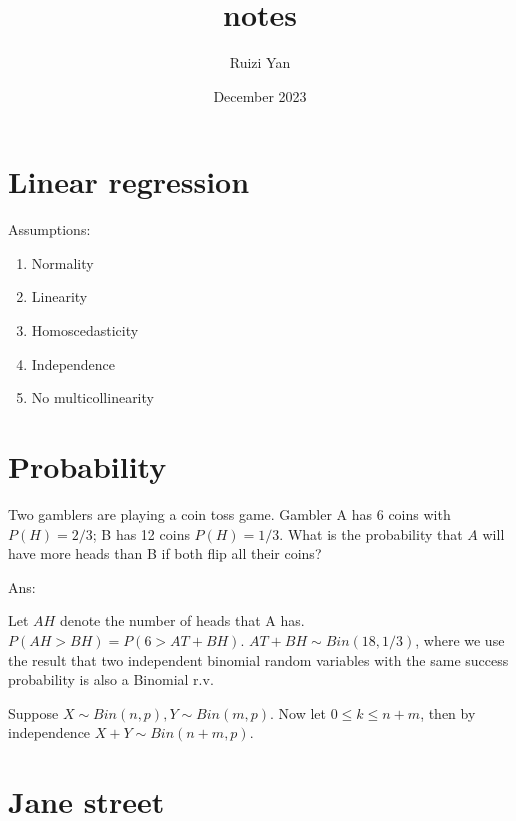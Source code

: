 \documentclass{article}
\title{notes}
\author{Ruizi Yan}
\date{December 2023}
\begin{document}
\maketitle

\section{Linear regression}
Assumptions: 
\begin{enumerate}
    \item Normality 
    \item Linearity
    \item Homoscedasticity 
    \item Independence 
    \item No multicollinearity
\end{enumerate}


\section{Probability}

Two gamblers are playing a coin toss game. Gambler A has 6 coins with $P(H)=2/3$; B has 12 coins $P(H)=1/3$. What is the probability that $A$ will have more heads than B if both flip all their coins?

Ans: 

Let $AH$ denote the number of heads that A has. $P(AH>BH)=P(6>AT+BH)$. 
$AT+BH\sim Bin(18,1/3)$, where we use the result that two independent binomial random variables with the same success probability is also a Binomial r.v.

Suppose $X \sim Bin(n, p), Y \sim Bin(m, p)$. Now let $0 \leq k \leq n+m$, then by independence $X+Y \sim Bin(n+m, p)$.

\section{Jane street}
\end{document}
